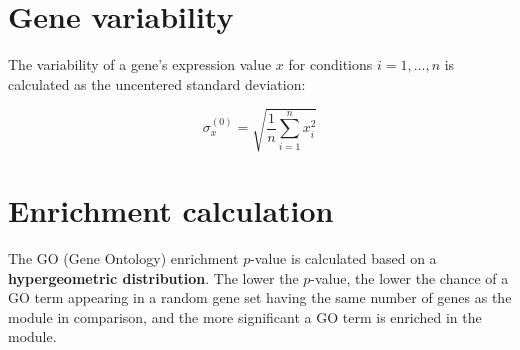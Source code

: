 \section{Gene variability}\label{apd:gene-sd}

The variability of a gene's expression value $x$ for conditions $i=1,…,n$ is 
calculated as the uncentered standard deviation: 

\begin{equation}
\sigma_x^{(0)}=\sqrt{\frac{1}{n}\sum\limits_{i=1}^{n}x_i^2}
\end{equation}


\section{Enrichment calculation}\label{apd:enrichment}

The GO (Gene Ontology) enrichment $p$-value is calculated based on a 
\textbf{hypergeometric distribution}. The lower the $p$-value, the lower the 
chance of a GO term appearing in a random gene set having the same number of 
genes as the module in comparison, and the more significant a GO term is 
enriched in the module.
%








